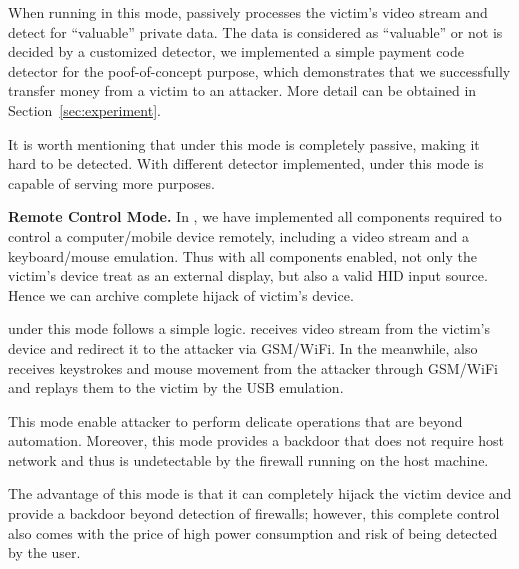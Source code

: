 When running in this mode, \tool passively processes the victim's video stream
and detect for ``valuable'' private data.  The data is considered as
``valuable'' or not is decided by a customized detector, we implemented a simple
payment code detector for the poof-of-concept purpose, which demonstrates that we successfully transfer money from a victim to an
attacker. More detail can be obtained in Section~\ref{sec:experiment}.

It is worth mentioning that \tool under this mode is completely passive, making
it hard to be detected. With different detector implemented, \tool
under this mode is capable of serving more purposes.

\textbf{Remote Control Mode.} In \tool, we have implemented all components
required to control a computer/mobile device remotely, including a video stream
and a keyboard/mouse emulation. Thus with all components enabled, not only
the victim's device treat \tool as an external display, but also a valid HID
input source. Hence we can archive complete hijack of victim's device.

\tool under this mode follows a simple logic. \tool receives video stream
from the victim's device and redirect it to the attacker via GSM/WiFi. In the
meanwhile, \tool also receives keystrokes and mouse movement from the attacker
through GSM/WiFi and replays them to the victim by the USB emulation.

This mode enable attacker to perform delicate operations that are beyond
automation. Moreover, this mode provides a backdoor that does not require host
network and thus is undetectable by the firewall running on the host machine.

The advantage of this mode is that it can completely hijack the victim device
and provide a backdoor beyond detection of firewalls; however, this complete control
also comes with the price of high power consumption and risk of being detected
by the user.

